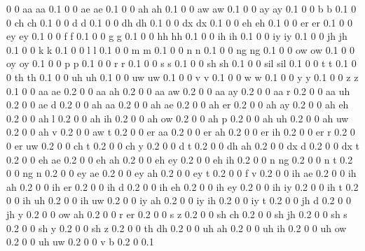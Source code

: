 0 0 aa aa 0.1
0 0 ae ae 0.1
0 0 ah ah 0.1
0 0 aw aw 0.1
0 0 ay ay 0.1
0 0 b b 0.1
0 0 ch ch 0.1
0 0 d d 0.1
0 0 dh dh 0.1
0 0 dx dx 0.1
0 0 eh eh 0.1
0 0 er er 0.1
0 0 ey ey 0.1
0 0 f f 0.1
0 0 g g 0.1
0 0 hh hh 0.1
0 0 ih ih 0.1
0 0 iy iy 0.1
0 0 jh jh 0.1
0 0 k k 0.1
0 0 l l 0.1
0 0 m m 0.1
0 0 n n 0.1
0 0 ng ng 0.1
0 0 ow ow 0.1
0 0 oy oy 0.1
0 0 p p 0.1
0 0 r r 0.1
0 0 s s 0.1
0 0 sh sh 0.1
0 0 sil sil 0.1
0 0 t t 0.1
0 0 th th 0.1
0 0 uh uh 0.1
0 0 uw uw 0.1
0 0 v v 0.1
0 0 w w 0.1
0 0 y y 0.1
0 0 z z 0.1
0 0 aa ae 0.2
0 0 aa ah 0.2
0 0 aa aw 0.2
0 0 aa ay 0.2
0 0 aa r 0.2
0 0 aa uh 0.2
0 0 ae d 0.2
0 0 ah aa 0.2
0 0 ah ae 0.2
0 0 ah er 0.2
0 0 ah ay 0.2
0 0 ah eh 0.2
0 0 ah l 0.2
0 0 ah ih 0.2
0 0 ah ow 0.2
0 0 ah p 0.2
0 0 ah uh 0.2
0 0 ah uw 0.2
0 0 ah v 0.2
0 0 aw t 0.2
0 0 er aa 0.2
0 0 er ah 0.2
0 0 er ih 0.2
0 0 er r 0.2
0 0 er uw 0.2
0 0 ch t 0.2
0 0 ch y 0.2
0 0 d t 0.2
0 0 dh ah 0.2
0 0 dx d 0.2
0 0 dx t 0.2
0 0 eh ae 0.2
0 0 eh ah 0.2
0 0 eh ey 0.2
0 0 eh ih 0.2
0 0 n ng 0.2
0 0 n t 0.2
0 0 ng n 0.2
0 0 ey ae 0.2
0 0 ey ah 0.2
0 0 ey t 0.2
0 0 f v 0.2
0 0 ih ae 0.2
0 0 ih ah 0.2
0 0 ih er 0.2
0 0 ih d 0.2
0 0 ih eh 0.2
0 0 ih ey 0.2
0 0 ih iy 0.2
0 0 ih t 0.2
0 0 ih uh 0.2
0 0 ih uw 0.2
0 0 iy ah 0.2
0 0 iy ih 0.2
0 0 iy t 0.2
0 0 jh d 0.2
0 0 jh y 0.2
0 0 ow ah 0.2
0 0 r er 0.2
0 0 s z 0.2
0 0 sh ch 0.2
0 0 sh jh 0.2
0 0 sh s 0.2
0 0 sh y 0.2
0 0 sh z 0.2
0 0 th dh 0.2
0 0 uh ah 0.2
0 0 uh ih 0.2
0 0 uh ow 0.2
0 0 uh uw 0.2
0 0 v b 0.2
0 0.1
